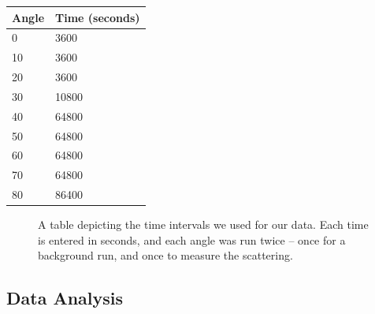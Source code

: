 \documentclass[10pt,letterpaper,onecolumn]{article}
\begin{document}
\begin{table}[tbp]
    \centering
    \begin{tabular}{ll}
    Angle                    & Time (seconds)             \\ \hline
    \multicolumn{1}{|l|}{0}  & \multicolumn{1}{l|}{3600}  \\ \hline
    \multicolumn{1}{|l|}{10} & \multicolumn{1}{l|}{3600}  \\ \hline
    \multicolumn{1}{|l|}{20} & \multicolumn{1}{l|}{3600}  \\ \hline
    \multicolumn{1}{|l|}{30} & \multicolumn{1}{l|}{10800} \\ \hline
    \multicolumn{1}{|l|}{40} & \multicolumn{1}{l|}{64800} \\ \hline
    \multicolumn{1}{|l|}{50} & \multicolumn{1}{l|}{64800} \\ \hline
    \multicolumn{1}{|l|}{60} & \multicolumn{1}{l|}{64800} \\ \hline
    \multicolumn{1}{|l|}{70} & \multicolumn{1}{l|}{64800} \\ \hline
    \multicolumn{1}{|l|}{80} & \multicolumn{1}{l|}{86400} \\ \hline
    \end{tabular}
\end{table}
\begin{figure}
    \caption{A table depicting the time intervals we used for our data. Each time is entered in seconds, and each angle was run twice -- once for a background run, and once to measure the scattering.}
\end{figure}
\subsection{Data Analysis}
\end{document}
